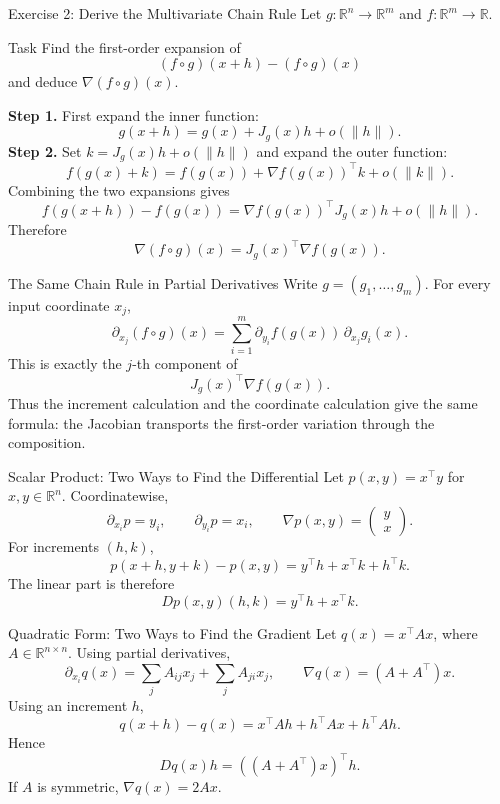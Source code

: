 \documentclass[aspectratio=169]{beamer}
\newcommand{\R}{\mathbb{R}}
\begin{document}
\begin{frame}{Exercise 2: Derive the Multivariate Chain Rule}
\footnotesize
\setlength{\abovedisplayskip}{4pt}
\setlength{\belowdisplayskip}{4pt}
Let $g:\R^n\to\R^m$ and $f:\R^m\to\R$.
\begin{exampleblock}{Task}
Find the first-order expansion of
\[
(f\circ g)(x+h)-(f\circ g)(x)
\]
and deduce $\nabla(f\circ g)(x)$.
\end{exampleblock}
\pause
\textbf{Step 1.} First expand the inner function:
\[
g(x+h)=g(x)+J_g(x)h+o(\|h\|).
\]
\pause
\textbf{Step 2.} Set $k=J_g(x)h+o(\|h\|)$ and expand the outer function:
\[
f(g(x)+k)=f(g(x))+\nabla f(g(x))^\top k+o(\|k\|).
\]
\pause
Combining the two expansions gives
\[
f(g(x+h))-f(g(x))
=\nabla f(g(x))^\top J_g(x)h+o(\|h\|).
\]
Therefore
\[
\boxed{\nabla(f\circ g)(x)=J_g(x)^\top\nabla f(g(x)).}
\]
\end{frame}

\begin{frame}{The Same Chain Rule in Partial Derivatives}
Write $g=(g_1,\ldots,g_m)$. For every input coordinate $x_j$,
\[
\boxed{
\partial_{x_j}(f\circ g)(x)
=\sum_{i=1}^m
\partial_{y_i}f(g(x))\,\partial_{x_j}g_i(x).}
\]
\pause
This is exactly the $j$-th component of
\[
J_g(x)^\top\nabla f(g(x)).
\]
Thus the increment calculation and the coordinate calculation give the same
formula: the Jacobian transports the first-order variation through the
composition.
\end{frame}

\begin{frame}{Scalar Product: Two Ways to Find the Differential}
Let $p(x,y)=x^\top y$ for $x,y\in\R^n$.
\pause
Coordinatewise,
\[
\partial_{x_i}p=y_i,
\qquad
\partial_{y_i}p=x_i,
\qquad
\boxed{\nabla p(x,y)=\begin{pmatrix}y\\x\end{pmatrix}.}
\]
\pause
For increments $(h,k)$,
\[
p(x+h,y+k)-p(x,y)
=y^\top h+x^\top k+h^\top k.
\]
The linear part is therefore
\[
\boxed{Dp(x,y)(h,k)=y^\top h+x^\top k.}
\]
\end{frame}

\begin{frame}{Quadratic Form: Two Ways to Find the Gradient}
Let $q(x)=x^\top Ax$, where $A\in\R^{n\times n}$.
\pause
Using partial derivatives,
\[
\partial_{x_i}q(x)
=\sum_j A_{ij}x_j+\sum_j A_{ji}x_j,
\qquad
\boxed{\nabla q(x)=(A+A^\top)x.}
\]
\pause
Using an increment $h$,
\[
q(x+h)-q(x)
=x^\top Ah+h^\top Ax+h^\top Ah.
\]
Hence
\[
Dq(x)h=((A+A^\top)x)^\top h.
\]
If $A$ is symmetric, $\nabla q(x)=2Ax$.
\end{frame}
\end{document}
